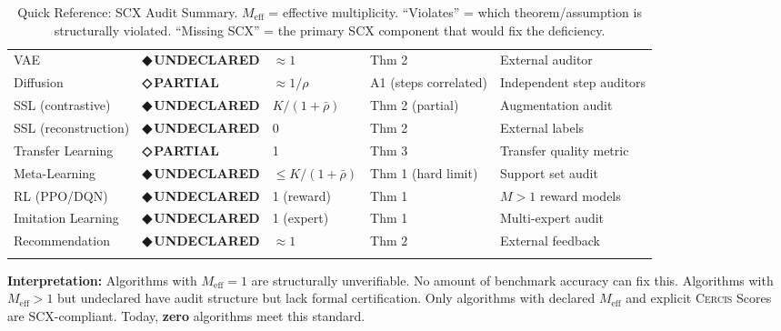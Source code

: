 \documentclass[12pt,a4paper]{article}
\theoremstyle{definition}
\newcommand{\guilty}{{\color{guiltycolor}\textbf{◆\,UNDECLARED}}}
\newcommand{\weakness}{{\color{weakcolor}\textbf{◇\,PARTIAL}}}
\newcommand{\Cercis}{\textsc{Cercis}}
\newcommand{\SCX}{\textsc{SCX}}
\begin{document}
\begin{longtable}{p{3.2cm} p{1.2cm} p{1.2cm} p{2cm} p{3cm}}
VAE & \guilty{} & $\approx 1$ & Thm 2 & External auditor \\
Diffusion & \weakness{} & $\approx 1/\rho$ & A1 (steps correlated) & Independent step auditors \\
SSL (contrastive) & \guilty{} & $K/(1+\bar{\rho})$ & Thm 2 (partial) & Augmentation audit \\
SSL (reconstruction) & \guilty{} & 0 & Thm 2 & External labels \\
Transfer Learning & \weakness{} & 1 & Thm 3 & Transfer quality metric \\
Meta-Learning & \guilty{} & $\le K/(1+\bar{\rho})$ & Thm 1 (hard limit) & Support set audit \\
RL (PPO/DQN) & \guilty{} & 1 (reward) & Thm 1 & $M>1$ reward models \\
Imitation Learning & \guilty{} & 1 (expert) & Thm 1 & Multi-expert audit \\
Recommendation & \guilty{} & $\approx 1$ & Thm 2 & External feedback \\
\bottomrule
\caption{Quick Reference: SCX Audit Summary. $M_{\text{eff}}$ = effective multiplicity. ``Violates'' = which theorem/assumption is structurally violated. ``Missing SCX'' = the primary SCX component that would fix the deficiency.}
\label{tab:quickref}
\end{longtable}

\noindent\textbf{Interpretation:} Algorithms with $M_{\text{eff}}=1$ are structurally unverifiable. No amount of benchmark accuracy can fix this. Algorithms with $M_{\text{eff}} > 1$ but undeclared have audit structure but lack formal certification. Only algorithms with declared $M_{\text{eff}}$ and explicit \Cercis{} Scores are \SCX{}-compliant. Today, \textbf{zero} algorithms meet this standard.

\vspace{24pt}
\end{document}
